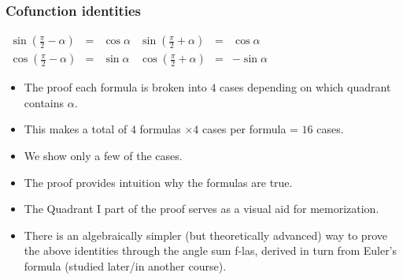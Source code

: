 \begin{frame}
\frametitle{Cofunction identities}
\vskip -0.1cm
\begin{proposition}
\hfil \hfil$
\renewcommand{\arraystretch}{1.4}
\begin{array}{rclrcl}
\displaystyle \sin \left(\frac{\pi}{2}-\alpha\right)&=&\cos \alpha &\displaystyle \sin \left(\frac{\pi}{2}+\alpha\right)&=&\cos \alpha \\
\displaystyle \cos \left(\frac{\pi}{2}- \alpha\right)&=&\sin \alpha &\displaystyle \cos \left(\frac{\pi}{2}+\alpha\right)&=&-\sin \alpha
\end{array}
$
\end{proposition}
\begin{itemize}
\item<2-> The proof each formula is broken into $4$ cases depending on which quadrant contains $\alpha$.
\item<3-> This makes a total of $4 $ formulas $\times 4$ cases per formula = $16$ cases.
\item<4-> We show only a few of the cases.
\item<5-> The proof provides intuition why the formulas are true. \item<6-> The Quadrant I part of the proof serves as a visual aid for memorization. 
\item<7-> There is an algebraically simpler (but theoretically advanced) way to prove the above identities through the angle sum f-las, derived in turn from Euler's formula (studied later/in another course).

\end{itemize}

\vskip 10cm
\end{frame}


